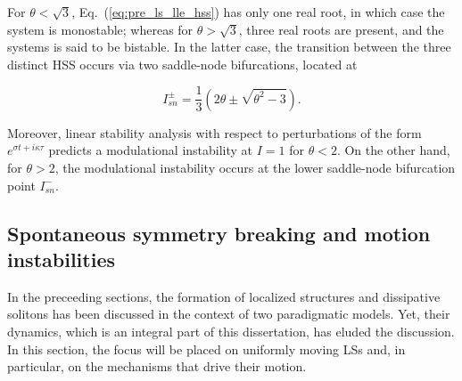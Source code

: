For $\theta < \sqrt{3}$, Eq.~(\ref{eq:pre_ls_lle_hss}) has only one real root, in which case the system is monostable; whereas
for $\theta > \sqrt{3}$, three real roots are present, and the systems is said to be bistable. In the latter case, the
transition between the three distinct HSS occurs via two saddle-node bifurcations, located at

\begin{equation}
    I_{sn}^{\pm} = \dfrac{1}{3} \left(2\theta \pm \sqrt{\theta^2 - 3}\right).
    \label{eq:pre_ls_lle_sn}
\end{equation}

Moreover, linear stability analysis
with respect to perturbations of the form $e^{\sigma t + i\kappa \tau}$ predicts a modulational instability at $I = 1$
for $\theta < 2$. On the other hand, for $\theta > 2$, the modulational instability occurs at the lower saddle-node
bifurcation point $I_{sn}^-$.






\subsection{Spontaneous symmetry breaking and motion instabilities}

In the preceeding sections, the formation of localized structures and dissipative solitons
has been discussed in the context of two paradigmatic models. Yet, their dynamics, which is
an integral part of this dissertation, has eluded the discussion. In this section, the focus
will be placed on uniformly moving LSs and, in particular, on the mechanisms that drive their motion.

